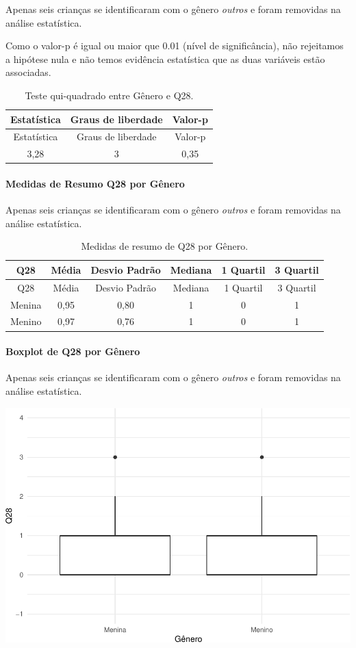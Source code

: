 \documentclass[]{article}
\let\oldparagraph\paragraph
\renewcommand{\paragraph}[1]{\oldparagraph{#1}\mbox{}}
\begin{document}
Apenas seis crianças se identificaram com o gênero \emph{outros} e foram removidas na análise estatística.

Como o valor-p é igual ou maior que 0.01 (nível de significância), não rejeitamos a hipótese nula e não temos evidência estatística que as duas variáveis estão associadas.

\begin{longtable}[]{@{}ccc@{}}
\caption{\label{tab:unnamed-chunk-851}Teste qui-quadrado entre Gênero e Q28.}\tabularnewline
\toprule
Estatística & Graus de liberdade & Valor-p\tabularnewline
\midrule
\endfirsthead
\toprule
Estatística & Graus de liberdade & Valor-p\tabularnewline
\midrule
\endhead
3,28 & 3 & 0,35\tabularnewline
\bottomrule
\end{longtable}

\cleardoublepage

\hypertarget{medidas-de-resumo-q28-por-guxeanero}{%
\paragraph{Medidas de Resumo Q28 por Gênero}\label{medidas-de-resumo-q28-por-guxeanero}}

Apenas seis crianças se identificaram com o gênero \emph{outros} e foram removidas na análise estatística.

\begin{longtable}[]{@{}cccccc@{}}
\caption{\label{tab:unnamed-chunk-852}Medidas de resumo de Q28 por Gênero.}\tabularnewline
\toprule
Q28 & Média & Desvio Padrão & Mediana & 1 Quartil & 3 Quartil\tabularnewline
\midrule
\endfirsthead
\toprule
Q28 & Média & Desvio Padrão & Mediana & 1 Quartil & 3 Quartil\tabularnewline
\midrule
\endhead
Menina & 0,95 & 0,80 & 1 & 0 & 1\tabularnewline
Menino & 0,97 & 0,76 & 1 & 0 & 1\tabularnewline
\bottomrule
\end{longtable}

\hypertarget{boxplot-de-q28-por-guxeanero}{%
\paragraph{Boxplot de Q28 por Gênero}\label{boxplot-de-q28-por-guxeanero}}

Apenas seis crianças se identificaram com o gênero \emph{outros} e foram removidas na análise estatística.

\begin{center}\includegraphics[width=0.75\linewidth]{relatorio_covid19_files/figure-latex/unnamed-chunk-853-1} \end{center}
\end{document}
